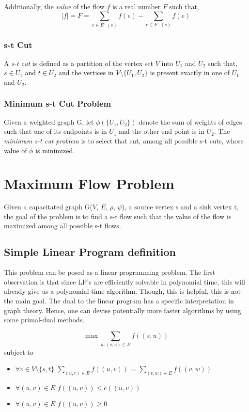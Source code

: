 \documentclass[BTech]{iitmdiss}
\begin{document}
	Additionally, the \textit{value} of the flow $f$ is a real number $F$ such that,
	$$\mid f\mid  = F = \displaystyle\sum_{e \in E^+(s)} f(e)- \displaystyle\sum_{e \in E^-(s)} f(e)$$
	
      \subsubsection{s-t Cut}
	A \textit{s-t cut} is defined as a partition of the vertex set $V$ into $U_1$ and $U_2$ such that, $s \in U_1$ and $t \in U_2$ and the vertices
	in $V \setminus \{U_1, U_2 \}$ is present exactly in one of $U_1$ and $U_2$.
      
      \subsubsection{Minimum s-t Cut Problem}
	Given a weighted graph G, let $\phi(\{U_1,U_2\})$ denote the sum of weights of edges such that one of its endpoints is in $U_1$ and the other
	end point is in $U_2$. The \textit{minimum s-t cut problem} is to select that cut, among all possible s-t cuts, whose value of $\phi$ is minimized.
      \section{Maximum Flow Problem}
	Given a capacitated graph G($V$, $E$, $\rho$, $\psi$), a source vertex s and a sink vertex t, the goal of the problem is to find a s-t flow
	such that the value of the flow is maximized among all possible s-t flows. \\
	
	\subsection{Simple Linear Program definition}
	  This problem can be posed as a linear programming problem. The first observation is that since LP's are efficiently solvable in polynomial
	  time, this will already give us a polynomial time algorithm. Though, this is helpful, this is not the main goal. The dual to the linear
	  program has a specific interpretation in graph theory. Hence, one can devise potentially more faster algorithms by using some primal-dual
	  methods.
	  
	  $$\max \displaystyle\sum_{u:(s,u) \in E} f((s,u))$$
	  subject to
	  \begin{itemize}
	   \item
	      $\forall v \in V \setminus \{s,t\}$ $\displaystyle\sum_{(u,v) \in E} f((u,v))$ = $\displaystyle\sum_{(v,w) \in E} f((v,w))$
	   \item
	      $\forall (u,v) \in E$ $f((u,v)) \leq c((u,v))$
	   \item
	      $\forall(u,v) \in E$ $f((u,v)) \geq 0$
	      
	  \end{itemize}
	  
\end{document}
